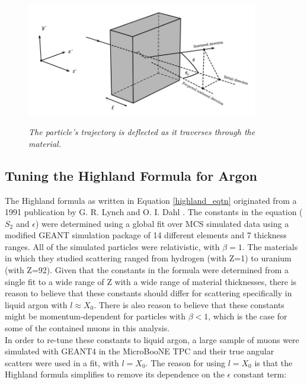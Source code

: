 \documentclass[a4paper,11pt]{article}
\begin{document}
\begin{figure}[ht!]
\centering
	\includegraphics[width=0.9\textwidth]{Figures/static_figs/mcs_nocap.png} \\
\caption{\textit{The particle's trajectory is deflected as it traverses through the material.}}\label{mcs_nocap_fig}
\end{figure}












\subsection{Tuning the Highland Formula for Argon}\label{highland_tuning_section}

The Highland formula as written in Equation \ref{highland_eqtn} originated from a 1991 publication by G. R. Lynch and O. I. Dahl \cite{highland-lynch-dahl}. The constants in the equation ($S_2$ and $\epsilon$) were determined using a global fit over MCS simulated data using a modified GEANT simulation package of 14 different elements and 7 thickness ranges. All of the simulated particles were relativistic, with $\beta=1$. The materials in which they studied scattering ranged from hydrogen (with Z=1) to uranium (with Z=92). Given that the constants in the formula were determined from a single fit to a wide range of Z with a wide range of material thicknesses, there is reason to believe that these constants should differ for scattering specifically in liquid argon with $l \approx X_0$. There is also reason to believe that these constants might be momentum-dependent for particles with $\beta < 1$, which is the case for some of the contained muons in this analysis.\\

In order to re-tune these constants to liquid argon, a large sample of muons were simulated with GEANT4 \cite{GEANT4_citation} in the MicroBooNE TPC and their true angular scatters were used in a fit, with $l = X_0$. The reason for using $l = X_0$ is that the Highland formula simplifies to remove its dependence on the $\epsilon$ constant term:
\end{document}
